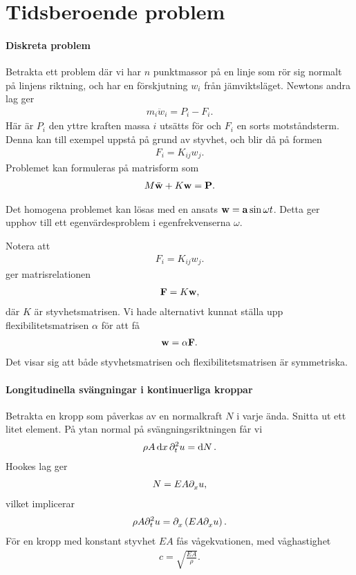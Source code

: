 \section{Tidsberoende problem}

\paragraph{Diskreta problem}
Betrakta ett problem där vi har $n$ punktmassor på en linje som rör sig normalt på linjens riktning, och har en förskjutning $w_{i}$ från jämviktsläget. Newtons andra lag ger
\begin{align*}
	m_{i}\ddot{w}_{i} = P_{i} - F_{i}.
\end{align*}
Här är $P_{i}$ den yttre kraften massa $i$ utsätts för och $F_{i}$ en sorts motståndsterm. Denna kan till exempel uppstå på grund av styvhet, och blir då på formen
\begin{align*}
	F_{i} = K_{ij}w_{j}.
\end{align*}
Problemet kan formuleras på matrisform som
\begin{align*}
	M\ddot{\vb{w}} + K\vb{w} = \vb{P}.
\end{align*}

Det homogena problemet kan lösas med en ansats $\vb{w} = \vb{a}\sin{\omega t}$. Detta ger upphov till ett egenvärdesproblem i egenfrekvenserna $\omega$.

Notera att 
\begin{align*}
	F_{i} = K_{ij}w_{j}.
\end{align*}
ger matrisrelationen
\begin{align*}
	\vb{F} = K\vb{w},
\end{align*}
där $K$ är styvhetsmatrisen. Vi hade alternativt kunnat ställa upp flexibilitetsmatrisen $\alpha$ för att få
\begin{align*}
	\vb{w} = \alpha\vb{F}.
\end{align*}
Det visar sig att både styvhetsmatrisen och flexibilitetsmatrisen är symmetriska.

\paragraph{Longitudinella svängningar i kontinuerliga kroppar}
Betrakta en kropp som påverkas av en normalkraft $N$ i varje ända. Snitta ut ett litet element. På ytan normal på svängningsriktningen får vi
\begin{align*}
	\rho A\dd{x}\del[2]{t}{u} = \dd{N}.
\end{align*}
Hookes lag ger
\begin{align*}
	N = EA\del{x}{u},
\end{align*}
vilket implicerar
\begin{align*}
	\rho A\del[2]{t}{u} = \del{x}{\left(EA\del{x}{u}\right)}.
\end{align*}
För en kropp med konstant styvhet $EA$ fås vågekvationen, med våghastighet
\begin{align*}
	c = \sqrt{\frac{EA}{\rho}}.
\end{align*}

